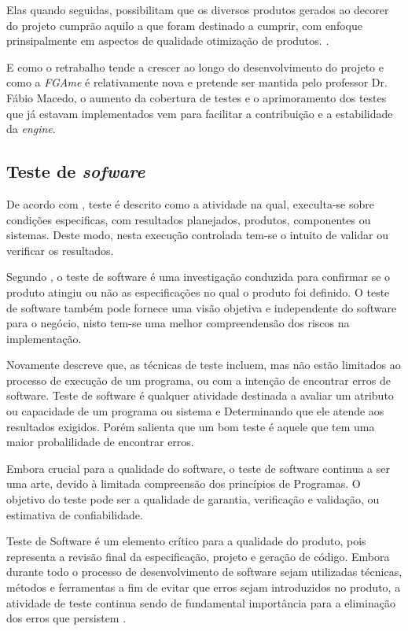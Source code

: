 Elas quando seguidas, possibilitam que os diversos produtos gerados ao decorer do projeto cumprão aquilo a que foram destinado a cumprir, com enfoque prinsipalmente em  aspectos de qualidade otimização de produtos.
.\cite{gregor}

E como o retrabalho tende a crescer ao longo do desenvolvimento do projeto e como a \textit{FGAme} é relativamente nova e pretende ser mantida pelo professor Dr. Fábio Macedo, o aumento da cobertura de testes e o aprimoramento dos testes que já estavam implementados vem para facilitar a contribuição e a estabilidade da \textit{engine}.


\subsection{Teste de \textit{sofware}}
	De acordo com \cite{IEEE}, teste é descrito como a atividade na qual, execulta-se sobre condições especificas, com resultados planejados, produtos, componentes ou sistemas. Deste modo, nesta execução controlada tem-se o intuito de validar ou verificar os resultados.



Segundo \cite{artigo_intro_teste}, o teste de software é uma investigação conduzida para confirmar se o produto atingiu ou não as especificações no qual o produto foi definido. O teste de software também pode fornece uma visão objetiva e independente do software para o negócio, nisto tem-se uma melhor compreendensão dos riscos na implementação. 

Novamente \cite{artigo_intro_teste} descreve que, as técnicas de teste incluem, mas não estão limitados ao processo de execução de um programa, ou com a intenção de encontrar erros de software. Teste de software é qualquer atividade destinada a avaliar um atributo ou capacidade de um programa ou sistema e Determinando que ele atende aos resultados exigidos. Porém \cite{artigo_intro_teste} salienta que um bom teste é aquele que tem uma maior probalilidade de encontrar erros.

Embora crucial para a qualidade do software, o teste de software continua a ser uma arte, devido à limitada compreensão dos princípios de Programas. 
 O objetivo do teste pode ser a qualidade de garantia, verificação e validação, ou estimativa de confiabilidade. 

Teste de Software é um elemento crítico para a qualidade do produto, pois representa a revisão final da especificação, projeto e geração de código. Embora durante todo o processo de desenvolvimento de software sejam utilizadas técnicas, métodos e ferramentas a fim de evitar que erros sejam introduzidos no produto, a atividade de teste continua sendo de fundamental importância para a eliminação dos erros que persistem \cite{maldonado}.

